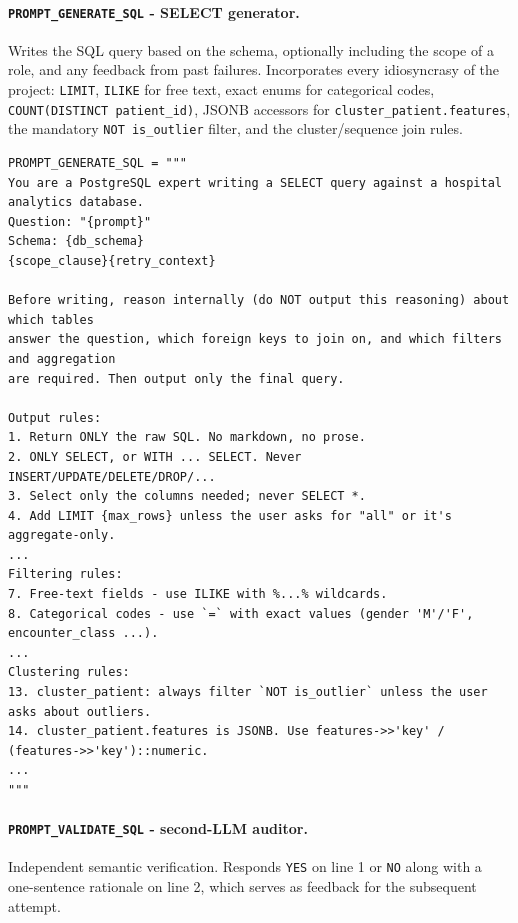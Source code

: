 \paragraph{\texttt{PROMPT\_\allowbreak GENERATE\_\allowbreak SQL} - SELECT generator.} Writes the SQL query based on the schema, optionally including the scope of a role, and any feedback from past failures. Incorporates every idiosyncrasy of the project: \texttt{LIMIT}, \texttt{ILIKE} for free text, exact enums for categorical codes, \texttt{COUNT(DISTINCT patient\_id)}, JSONB accessors for \texttt{cluster\_patient.features}, the mandatory \texttt{NOT is\_outlier} filter, and the cluster/sequence join rules.

\begin{lstlisting}[style=pythonstyle]
PROMPT_GENERATE_SQL = """
You are a PostgreSQL expert writing a SELECT query against a hospital analytics database.
Question: "{prompt}"
Schema: {db_schema}
{scope_clause}{retry_context}

Before writing, reason internally (do NOT output this reasoning) about which tables
answer the question, which foreign keys to join on, and which filters and aggregation
are required. Then output only the final query.

Output rules:
1. Return ONLY the raw SQL. No markdown, no prose.
2. ONLY SELECT, or WITH ... SELECT. Never INSERT/UPDATE/DELETE/DROP/...
3. Select only the columns needed; never SELECT *.
4. Add LIMIT {max_rows} unless the user asks for "all" or it's aggregate-only.
...
Filtering rules:
7. Free-text fields - use ILIKE with %...% wildcards.
8. Categorical codes - use `=` with exact values (gender 'M'/'F', encounter_class ...).
...
Clustering rules:
13. cluster_patient: always filter `NOT is_outlier` unless the user asks about outliers.
14. cluster_patient.features is JSONB. Use features->>'key' / (features->>'key')::numeric.
...
"""
\end{lstlisting}

\paragraph{\texttt{PROMPT\_\allowbreak VALIDATE\_\allowbreak SQL} - second-LLM auditor.} Independent semantic verification. Responds \texttt{YES} on line 1 or \texttt{NO} along with a one-sentence rationale on line 2, which serves as feedback for the subsequent attempt.


